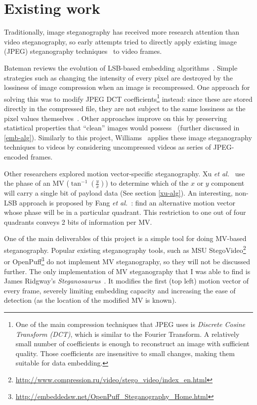 \documentclass[12pt,british,twoside,notitlepage,usenames,dvipsnames,hypens,final]{report}
\numberwithin{equation}{section}
\numberwithin{figure}{section}
\begin{document}
\section{Existing work}
Traditionally, image steganography has received more research attention than video steganography, so early attempts tried to directly apply existing image (JPEG) steganography techniques~\cite{bateman, jpegdctcoding} to video frames.

Bateman reviews the evolution of LSB-based embedding algorithms~\cite{bateman}. Simple strategies such as changing the intensity of every pixel are destroyed by the lossiness of image compression when an image is recompressed. One approach for solving this was to modify JPEG DCT coefficients\footnote{
One of the main compression techniques that JPEG uses is \emph{Discrete Cosine Transform (DCT)}, which is similar to the Fourier Transform. A relatively small number of coefficients is enough to reconstruct an image with sufficient quality. Those coefficients are insensitive to small changes, making them suitable for data embedding.} instead: since these are stored directly in the compressed file, they are not subject to the same lossiness as the pixel values themselves~\cite{jpegdctcoding}. Other approaches improve on this by preserving statistical properties that ``clean'' images would possess~\cite{bateman, f5} (further discussed in \ref{emb-alg}). Similarly to this project, Williams~\cite{scott-fs} applies these image steganography techniques to videos by considering uncompressed videos as series of JPEG-encoded frames.

Other researchers explored motion vector-specific steganography. Xu \emph{et al.}~\cite{xu2006steganography} use the phase of an MV ($\tan^{-1}(\frac{y}{x})$) to determine which of the $x$ or $y$ component will carry a single bit of payload data (See section \ref{xu-alg}). An interesting, non-LSB approach is proposed by Fang \emph{et al.}~\cite{fang2006data}: find an alternative motion vector whose phase will be in a particular quadrant. This restriction to one out of four quadrants conveys 2 bits of information per MV.

One of the main deliverables of this project is a simple tool for doing MV-based steganography. Popular existing steganography tools, such as MSU StegoVideo\footnote{\url{http://www.compression.ru/video/stego_video/index_en.html}} or OpenPuff\footnote{\url{http://embeddedsw.net/OpenPuff_Steganography_Home.html}} do not implement MV steganography, so they will not be discussed further. The only implementation of MV steganography that I was able to find is James Ridgway's \emph{Steganosaurus}~\cite{steganosaurus}. It modifies the first (top left) motion vector of every frame, severely limiting embedding capacity and increasing the ease of detection (as the location of the modified MV is known).
\end{document}
